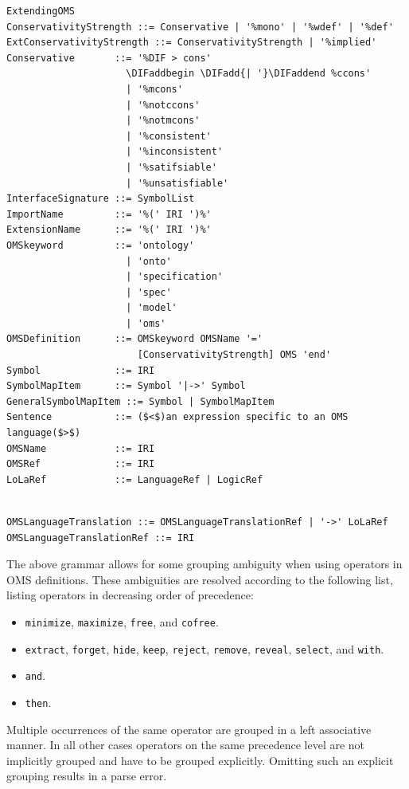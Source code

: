 \documentclass[10pt,fleqn,final]{scrreprt}
\newcommand*{\syntax}[1]{\texttt{#1}}
\newenvironment{definitions}[0]{\medskip }{}
\providecommand{\DIFadd}[1]{{\protect\color{blue}\uwave{#1}}} %
\providecommand{\DIFaddbegin}{} %
\providecommand{\DIFaddend}{} %
\begin{document}
\begin{definitions}
\begin{lstlisting}[language=ebnf,escapeinside={()},mathescape]
                       ExtendingOMS
ConservativityStrength ::= Conservative | '%mono' | '%wdef' | '%def'
ExtConservativityStrength ::= ConservativityStrength | '%implied'
Conservative       ::= '%DIF > cons'
                     \DIFaddbegin \DIFadd{| '}\DIFaddend %ccons'
                     | '%mcons'
                     | '%notccons'
                     | '%notmcons'
                     | '%consistent'
                     | '%inconsistent'
                     | '%satifsiable'
                     | '%unsatisfiable'
InterfaceSignature ::= SymbolList
ImportName         ::= '%(' IRI ')%'
ExtensionName      ::= '%(' IRI ')%'
OMSkeyword         ::= 'ontology'
                     | 'onto'
                     | 'specification'
                     | 'spec'
                     | 'model'
                     | 'oms'
OMSDefinition      ::= OMSkeyword OMSName '='
                       [ConservativityStrength] OMS 'end'
Symbol             ::= IRI
SymbolMapItem      ::= Symbol '|->' Symbol
GeneralSymbolMapItem ::= Symbol | SymbolMapItem
Sentence           ::= ($<$)an expression specific to an OMS language($>$) 
OMSName            ::= IRI
OMSRef             ::= IRI
LoLaRef            ::= LanguageRef | LogicRef
\end{lstlisting}


\begin{lstlisting}[language=ebnf,mathescape]

OMSLanguageTranslation ::= OMSLanguageTranslationRef | '->' LoLaRef
OMSLanguageTranslationRef ::= IRI
\end{lstlisting}



The above grammar allows for some grouping ambiguity when using operators in
OMS definitions. These ambiguities are resolved according to the following
list, listing operators in decreasing order of precedence:
\begin{itemize}
  \item \syntax{minimize}, \syntax{maximize}, \syntax{free}, and \syntax{cofree}. 
  \item \syntax{extract}, \syntax{forget}, \syntax{hide}, \syntax{keep},
    \syntax{reject}, \syntax{remove}, \syntax{reveal}, \syntax{select}, and
    \syntax{with}.
  \item \syntax{and}.
  \item \syntax{then}.
\end{itemize}
Multiple occurrences of the same operator are grouped in a left associative
manner. In all other cases operators on the same precedence level are not
implicitly grouped and have to be grouped explicitly. Omitting such an explicit
grouping results in a parse error.



\end{definitions}
\end{document}
